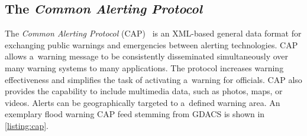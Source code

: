 \documentclass[runningheads,a4paper]{llncs}
\begin{document}
\subsection{The \emph{Common Alerting Protocol}}

The \emph{Common Alerting Protocol} (CAP)~\cite{westfall2010cap}
is an XML-based general data format for exchanging public warnings
and emergencies between alerting technologies.
CAP allows a~warning message to be consistently disseminated simultaneously
over many warning systems to many applications.
The protocol increases warning effectiveness and
simplifies the task of activating a~warning for officials.
CAP also provides the capability to include multimedia data,
such as photos, maps, or videos.
Alerts can be geographically targeted to a~defined warning area.
An exemplary flood warning CAP feed stemming from GDACS is shown in
\autoref{listing:cap}.
\end{document}
